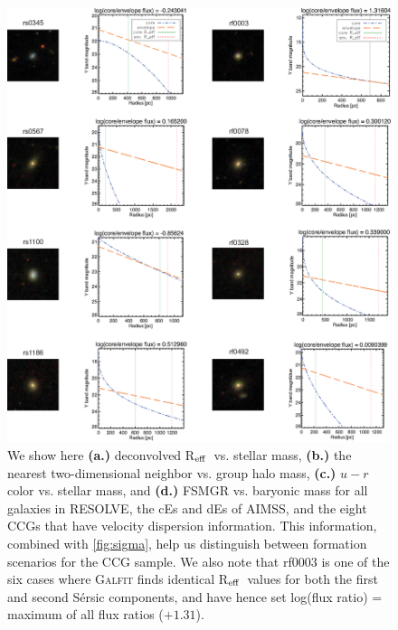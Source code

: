 \documentclass[iop,apj]{emulateapj}
\newcommand{\Reff}{R$_{\rm eff}$}
\begin{document}
\begin{figure}[b]
\begin{center}
\includegraphics[scale=0.7]{imageplots.eps}
\caption{We show here \textbf{(a.)} deconvolved \Reff\ vs. stellar mass, \textbf{(b.)} the nearest two-dimensional neighbor vs. group halo mass, \textbf{(c.)} $u-r$ color vs. stellar mass, and \textbf{(d.)} FSMGR vs. baryonic mass for all galaxies in RESOLVE, the cEs and dEs of AIMSS, and the eight CCGs that have velocity dispersion information. This information, combined with \autoref{fig:sigma}, help us distinguish between formation scenarios for the CCG sample. We also note that rf0003 is one of the six cases where \textsc{Galfit} finds identical \Reff\ values for both the first and second S\'ersic components, and have hence set log(flux ratio) = maximum of all flux ratios ($+1.31$).}
\label{fig:imageplots}
\end{center}
\end{figure}

\end{document}
